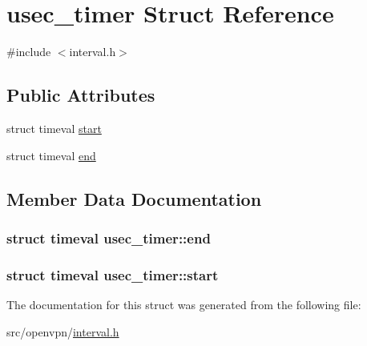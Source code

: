 \hypertarget{structusec__timer}{}\section{usec\+\_\+timer Struct Reference}
\label{structusec__timer}


{\ttfamily \#include $<$interval.\+h$>$}

\subsection*{Public Attributes}
\begin{DoxyCompactItemize}
\item 
struct timeval \hyperlink{structusec__timer_aee41f136297ad51eff81021d806eb5ba}{start}
\item 
struct timeval \hyperlink{structusec__timer_a5aeef42dd8346db1083d51a10abdb4a0}{end}
\end{DoxyCompactItemize}


\subsection{Member Data Documentation}
\hypertarget{structusec__timer_a5aeef42dd8346db1083d51a10abdb4a0}{}
\subsubsection[{end}]{\setlength{\rightskip}{0pt plus 5cm}struct timeval usec\+\_\+timer\+::end}\label{structusec__timer_a5aeef42dd8346db1083d51a10abdb4a0}
\hypertarget{structusec__timer_aee41f136297ad51eff81021d806eb5ba}{}
\subsubsection[{start}]{\setlength{\rightskip}{0pt plus 5cm}struct timeval usec\+\_\+timer\+::start}\label{structusec__timer_aee41f136297ad51eff81021d806eb5ba}


The documentation for this struct was generated from the following file\+:\begin{DoxyCompactItemize}
\item 
src/openvpn/\hyperlink{interval_8h}{interval.\+h}\end{DoxyCompactItemize}
